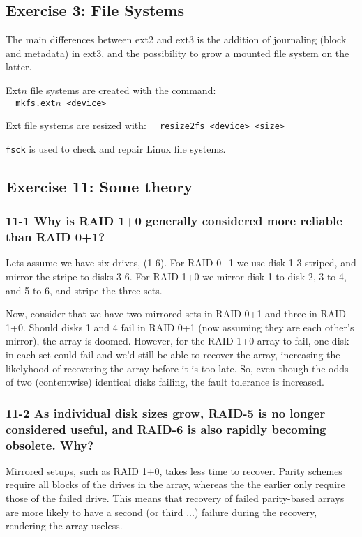 \subsection{Exercise 3: File Systems}

The main differences between ext2 and ext3 is the addition of journaling (block and metadata) in ext3, and the possibility to grow a mounted file system on the latter.

Ext$n$ file systems are created with the command: \\
\verb=  mkfs.ext=$n$\verb= <device>=

Ext file systems are resized with:
\verb=  resize2fs <device> <size>=

\verb=fsck= is used to check and repair Linux file systems.

\subsection{Exercise 11: Some theory}
\subsubsection{11-1 Why is RAID 1+0 generally considered more reliable than RAID 0+1?}
Lets assume we have six drives, (1-6). For RAID 0+1 we use disk 1-3 striped, and mirror the stripe to disks 3-6. For RAID 1+0 we mirror disk 1 to disk 2, 3 to 4, and 5 to 6, and stripe the three sets.

Now, consider that we have two mirrored sets in RAID 0+1 and three in RAID 1+0. Should disks 1 and 4 fail in RAID 0+1 (now assuming they are each other's mirror), the array is doomed. However, for the RAID 1+0 array to fail, one disk in each set could fail and we'd still be able to recover the array, increasing the likelyhood of recovering the array before it is too late. So, even though the odds of two (contentwise) identical disks failing, the fault tolerance is increased.

\subsubsection{11-2 As individual disk sizes grow, RAID-5 is no longer considered useful, and RAID-6 is also rapidly becoming obsolete. Why?}
Mirrored setups, such as RAID 1+0, takes less time to recover. Parity schemes require all blocks of the drives in the array, whereas the the earlier only require those of the failed drive. This means that recovery of failed parity-based arrays are more likely to have a second (or third ...) failure during the recovery, rendering the array useless.

